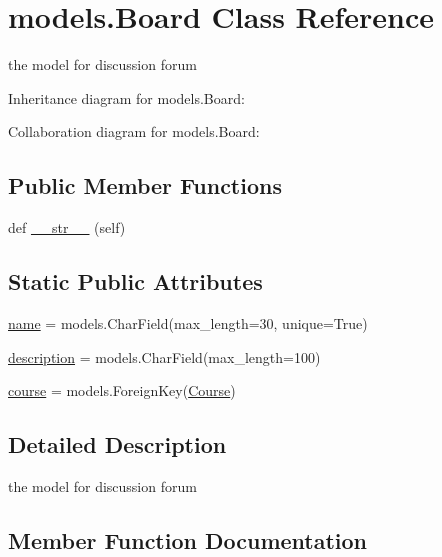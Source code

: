 \hypertarget{classmodels_1_1_board}{}\section{models.\+Board Class Reference}
\label{classmodels_1_1_board}


the model for discussion forum  




Inheritance diagram for models.\+Board\+:


Collaboration diagram for models.\+Board\+:
\subsection*{Public Member Functions}
\begin{DoxyCompactItemize}
\item 
def \hyperlink{classmodels_1_1_board_a8528585c770a632f241568dfd617c1a0}{\+\_\+\+\_\+str\+\_\+\+\_\+} (self)
\end{DoxyCompactItemize}
\subsection*{Static Public Attributes}
\begin{DoxyCompactItemize}
\item 
\hyperlink{classmodels_1_1_board_aa7fad256715594eb7d0b1bcb52966340}{name} = models.\+Char\+Field(max\+\_\+length=30, unique=True)
\item 
\hyperlink{classmodels_1_1_board_a8673506a714a563de609c678a40b7451}{description} = models.\+Char\+Field(max\+\_\+length=100)
\item 
\hyperlink{classmodels_1_1_board_a28e8f31a1b463191c2501716bf907cf6}{course} = models.\+Foreign\+Key(\hyperlink{classmodels_1_1_course}{Course})
\end{DoxyCompactItemize}


\subsection{Detailed Description}
the model for discussion forum 

\subsection{Member Function Documentation}
